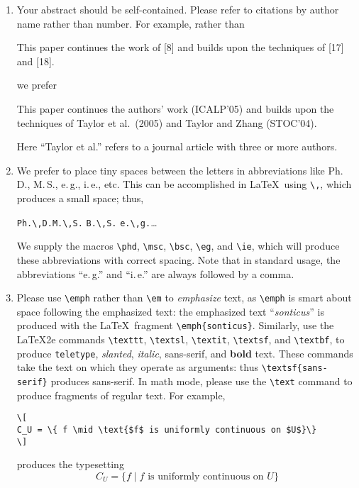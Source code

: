 \documentclass{article}
\newcommand{\eg}{e.\,g.}
\newcommand{\ie}{i.\,e.}
\newcommand{\phd}{\Ph.\,D.}
\newcommand{\bsc}{B.\,S.}
\newcommand{\msc}{M.\,S.}
\theoremstyle{plain}
\theoremstyle{definition}
\begin{document}
\begin{enumerate}
\item Your abstract should be self-contained. Please refer to
citations by author name rather than number. For example, rather than
\begin{center}
  \parbox{5in}{This paper continues the work of [8] and builds upon
  the techniques of [17] and [18].}
\end{center}
we prefer
\begin{center}
\parbox{5in}{This paper continues the authors' work (ICALP'05) and builds upon the
techniques of Taylor et al.\ (2005) and Taylor and Zhang (STOC'04).}
\end{center}
Here ``Taylor et al.'' refers to a journal article with three or more
authors.
\item We prefer to place tiny spaces between the letters in
  abbreviations like Ph.\,D., M.\,S., e.\,g., i.\,e., etc. This can be
  accomplished in \LaTeX\ using \lstinline.\,., which produces a small
  space; thus,
  \begin{center}
    \lstinline!Ph.\,D.!\qquad \lstinline!M.\,S.! \qquad \lstinline!B.\,S.! \qquad \lstinline!e.\,g.!\qquad\ldots
  \end{center}
  We supply the macros \lstinline!\phd!, \lstinline!\msc!, \lstinline!\bsc!,
  \lstinline!\eg!, and \lstinline!\ie!, which will produce these abbreviations
  with correct spacing. Note that in standard usage, the abbreviations
  ``\eg'' and ``\ie'' are always followed by a comma.
\item
  Please use \lstinline'\emph' rather than \lstinline'\em' to \emph{emphasize}
  text, as \lstinline'\emph' is smart about space following the emphasized
  text: the emphasized text ``\emph{sonticus}'' is produced with the
  \LaTeX\ fragment \lstinline'\emph{sonticus}'. Similarly, use the \LaTeX2e commands \lstinline'\texttt',
  \lstinline'\textsl', \lstinline'\textit', \lstinline'\textsf', and \lstinline'\textbf',
  to produce \texttt{teletype}, \textsl{slanted}, \textit{italic},
  \textsf{sans-serif}, and \textbf{bold} text. These commands take the
  text on which they operate as arguments: thus
  \lstinline'\textsf{sans-serif}' produces \textsf{sans-serif}.
  In math mode, please use the \lstinline,\text, command to produce
  fragments of regular text. For example,
\begin{lstlisting}
\[
C_U = \{ f \mid \text{$f$ is uniformly continuous on $U$}\}
\]
\end{lstlisting}
  produces the typesetting
  \[
  C_U = \{ f \mid \text{$f$ is uniformly continuous on $U$}\}
  \]


\end{enumerate}
\end{document}
